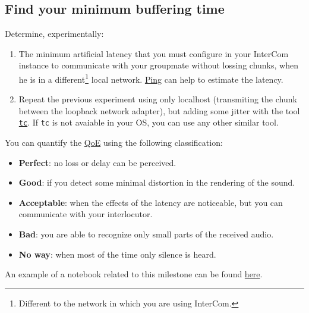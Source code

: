 \subsection*{Find your minimum buffering time}
Determine, experimentally:
\begin{enumerate}
\item The minimum artificial latency that you must configure in your
  InterCom instance to communicate with your groupmate without lossing
  chunks, when he is in a different\footnote{Different to the network
    in which you are using InterCom.} local network. \href{https://vicente-gonzalez-ruiz.github.io/about_ping/}{Ping} can help to estimate the latency.
\item Repeat the previous experiment using only localhost (transmiting
  the chunk between the loopback network adapter), but adding some
  jitter with the tool
  \href{https://vicente-gonzalez-ruiz.github.io/about_tc/}{\texttt{tc}}. If
  \texttt{tc} is not avaiable in your OS, you can use any other
  similar tool.
\end{enumerate}

You can quantify the \href{https://en.wikipedia.org/wiki/Quality_of_experience}{QoE} using the following classification:
\begin{itemize}
\item \textbf{Perfect}: no loss or delay can be perceived.
\item \textbf{Good}: if you detect some minimal distortion in the
  rendering of the sound.
\item \textbf{Acceptable}: when the effects of the latency are
  noticeable, but you can communicate with your interlocutor.
\item \textbf{Bad}: you are able to recognize only small parts of the
  received audio.
\item \textbf{No way}: when most of the time only silence is heard.
\end{itemize}

An example of a notebook related to this milestone can be found \href{https://github.com/Tecnologias-multimedia/InterCom/blob/master/docs/Hidding_the_Network_Jitter__example.ipynb}{here}.



